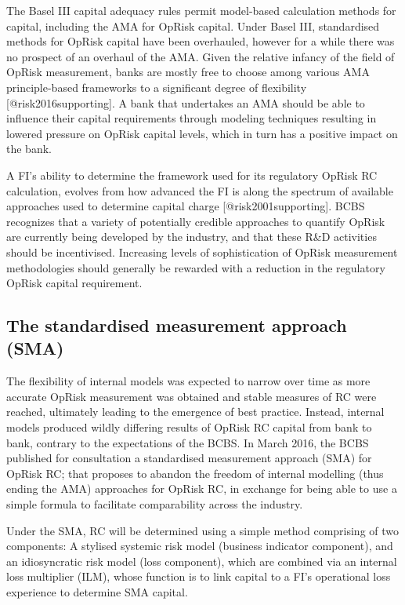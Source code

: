 \documentclass[
]{article}
\begin{document}
The Basel III capital adequacy rules permit model-based calculation
methods for capital, including the AMA for OpRisk capital. Under Basel
III, standardised methods for OpRisk capital have been overhauled,
however for a while there was no prospect of an overhaul of the AMA.
Given the relative infancy of the field of OpRisk measurement, banks are
mostly free to choose among various AMA principle-based frameworks to a
significant degree of flexibility {[}@risk2016supporting{]}. A bank that
undertakes an AMA should be able to influence their capital requirements
through modeling techniques resulting in lowered pressure on OpRisk
capital levels, which in turn has a positive impact on the bank.\medskip

A FI's ability to determine the framework used for its regulatory OpRisk
RC calculation, evolves from how advanced the FI is along the spectrum
of available approaches used to determine capital charge
{[}@risk2001supporting{]}. BCBS recognizes that a variety of potentially
credible approaches to quantify OpRisk are currently being developed by
the industry, and that these R\&D activities should be incentivised.
Increasing levels of sophistication of OpRisk measurement methodologies
should generally be rewarded with a reduction in the regulatory OpRisk
capital requirement.

\subsection{The standardised measurement approach (SMA)}

The flexibility of internal models was expected to narrow over time as
more accurate OpRisk measurement was obtained and stable measures of RC
were reached, ultimately leading to the emergence of best practice.
Instead, internal models produced wildly differing results of OpRisk RC
capital from bank to bank, contrary to the expectations of the BCBS. In
March 2016, the BCBS published for consultation a standardised
measurement approach (SMA) for OpRisk RC; that proposes to abandon the
freedom of internal modelling (thus ending the AMA) approaches for
OpRisk RC, in exchange for being able to use a simple formula to
facilitate comparability across the industry.\medskip

Under the SMA, RC will be determined using a simple method comprising of
two components: A stylised systemic risk model (business indicator
component), and an idiosyncratic risk model (loss component), which are
combined via an internal loss multiplier (ILM), whose function is to
link capital to a FI's operational loss experience to determine SMA
capital.\medskip
\end{document}
